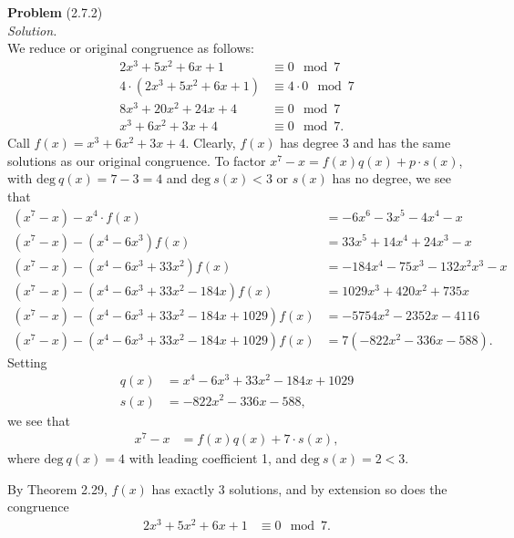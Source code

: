 \documentclass[12 pt]{amsart}
\begin{document}
\phantom{\quad} \vfill
\noindent
\textbf{Problem} (2.7.2) \\[4ex]
\emph{Solution.} \\[2ex]
  We reduce or original congruence as follows:
  \begin{align*}
    2x^3 + 5x^2 + 6x + 1 &\equiv 0 \mod 7 \\
    4\cdot(2x^3 + 5x^2 + 6x + 1) &\equiv 4 \cdot 0 \mod 7 \\
    8x^3 + 20x^2 + 24x + 4 &\equiv 0 \mod 7 \\
    x^3 + 6x^2 + 3x + 4 &\equiv 0 \mod 7.
  \end{align*}
  Call $f(x) = x^3 + 6x^2 + 3x + 4$.
  Clearly, $f(x)$ has degree 3 and 
  has the same solutions as
  our original congruence.
  To factor
  $x^7 - x = f(x) q(x) + p \cdot s(x)$, with
  $\text{deg}\ q(x) = 7 - 3 = 4$ and
  $\text{deg}\ s(x) < 3$ or $s(x)$ has no degree, 
  we see that
  \begin{align*}
    (x^7 - x) - x^4 \cdot f(x) &= -6x^6 - 3 x^5 - 4 x^4 - x \\
    (x^7 - x) - (x^4 - 6x^3) f(x)
      &= 33x^5 +14 x^4 + 24 x^3 - x \\
    (x^7 - x) - (x^4 - 6x^3 + 33x^2) f(x)
      &= -184x^4 -75 x^3 -132 x^2 x^3 - x \\
    (x^7 - x) - (x^4 - 6x^3 + 33x^2 - 184 x) f(x)
      &= 1029 x^3 +420 x^2 +735 x \\
    (x^7 - x) - (x^4 - 6x^3 + 33x^2 - 184x + 1029) f(x)
      &= -5754 x^2 - 2352 x - 4116 \\
    (x^7 - x) - (x^4 - 6x^3 + 33x^2 - 184x + 1029) f(x)
    &= 7 (-822 x^2 - 336 x - 588).
  \end{align*}
  Setting
  \begin{align*}
    q(x) &= x^4 - 6x^3 + 33x^2 - 184x + 1029 \\
    s(x) &= -822 x^2 - 336 x - 588,  
  \end{align*}
  we see that 
  \begin{align*}
    x^7 - x &= f(x) q(x) + 7 \cdot s(x),
  \end{align*}
  where 
  $\text{deg}\ q(x) = 4$ with leading coefficient 1, 
  and 
  $\text{deg}\ s(x) = 2 < 3$.

  By Theorem 2.29, 
  $f(x)$ has exactly 3 solutions, and by extension so does the
  congruence
  \begin{align*}
    2x^3 + 5x^2 + 6x + 1 &\equiv 0 \mod 7.
  \end{align*}
\vfill
\newpage
\end{document}
